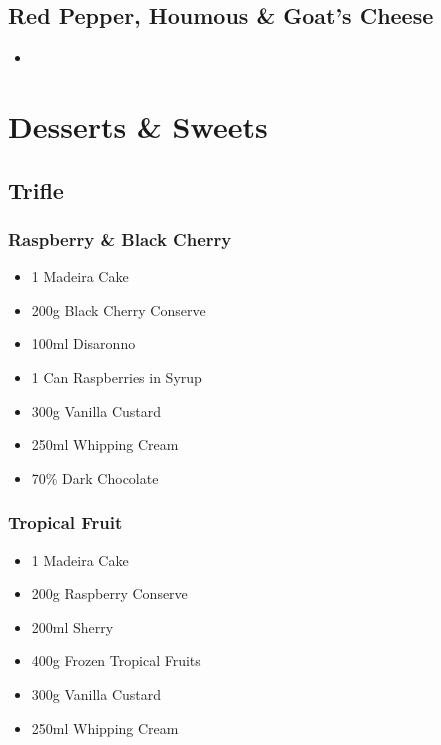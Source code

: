 \documentclass[11pt, english]{article}
\begin{document}
\newpage

	\subsection{Red Pepper, Houmous \& Goat's Cheese}

	\begin{itemize}
	\setlength\itemsep{0cm}
		\item 
	\end{itemize}

\newpage

\section{Desserts \& Sweets}

	\subsection{Trifle}

		\subsubsection*{Raspberry \& Black Cherry}

	\begin{itemize}
        \setlength\itemsep{0cm}
                \item 1 Madeira Cake
		\item 200g Black Cherry Conserve
		\item 100ml Disaronno
		\item 1 Can Raspberries in Syrup
		\item 300g Vanilla Custard
		\item 250ml Whipping Cream
		\item 70\% Dark Chocolate 
        \end{itemize}		

		\subsubsection*{Tropical Fruit}

	\begin{itemize}
        \setlength\itemsep{0cm}
                \item 1 Madeira Cake
		\item 200g Raspberry Conserve
		\item 200ml Sherry
		\item 400g Frozen Tropical Fruits
		\item 300g Vanilla Custard
		\item 250ml Whipping Cream
        \end{itemize}
\end{document}
